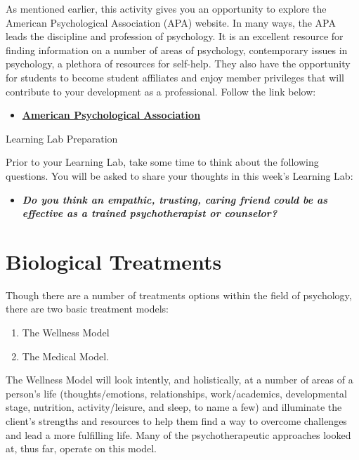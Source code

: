 \documentclass[
]{book}
\providecommand{\tightlist}{%
  \setlength{\itemsep}{0pt}\setlength{\parskip}{0pt}}
\begin{document}
\begin{reflect}
As mentioned earlier, this activity gives you an opportunity to explore the American Psychological Association (APA) website. In many ways, the APA leads the discipline and profession of psychology. It is an excellent resource for finding information on a number of areas of psychology, contemporary issues in psychology, a plethora of resources for self-help. They also have the opportunity for students to become student affiliates and enjoy member privileges that will contribute to your development as a professional. Follow the link below:

\begin{itemize}
\tightlist
\item
  \href{https://www.apa.org/}{\textbf{American Psychological Association}}
\end{itemize}

{Learning Lab Preparation}

Prior to your Learning Lab, take some time to think about the following questions. You will be asked to share your thoughts in this week's Learning Lab:

\begin{itemize}
\tightlist
\item
  \textbf{\emph{Do you think an empathic, trusting, caring friend could be as effective as a trained psychotherapist or counselor?}}
\end{itemize}
\end{reflect}

\hypertarget{biological-treatments-1}{%
\section{Biological Treatments}\label{biological-treatments-1}}

Though there are a number of treatments options within the field of psychology, there are two basic treatment models:

\begin{enumerate}
\def\labelenumi{\arabic{enumi}.}
\tightlist
\item
  The Wellness Model\\
\item
  The Medical Model.
\end{enumerate}

The Wellness Model will look intently, and holistically, at a number of areas of a person's life (thoughts/emotions, relationships, work/academics, developmental stage, nutrition, activity/leisure, and sleep, to name a few) and illuminate the client's strengths and resources to help them find a way to overcome challenges and lead a more fulfilling life. Many of the psychotherapeutic approaches looked at, thus far, operate on this model.
\end{document}
